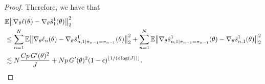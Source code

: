 \begin{proof}
Therefore, we have that
\begin{align}
    &\mathbb{E}\big\|\nabla_\theta\ell(\theta) - \nabla_\theta\hat s_1^1(\theta)\big\|_2^2 \\
    &\leq \sum_{n=1}^N \mathbb{E}\big\|\nabla_\theta\ell_n(\theta) - \nabla_\theta\hat s_{n,1|\hat\pi_{n-1}=\pi_{n-1}}^1(\theta)\big\|_2^2 + \sum_{n=1}^N \mathbb{E}\big\|\nabla_\theta\hat s_{n,1|\hat\pi_{n-1}=\pi_{n-1}}^1(\theta) - \nabla_\theta\hat s_{n,1}^1(\theta)\big\|_2^2\\
    &\lesssim N\frac{Cp \, G'(\theta)^2}{J} + Np \, G'(\theta)^2(1-\epsilon)^{\lfloor 1/(c\log(J)) \rfloor}.
\end{align}
\end{proof}

